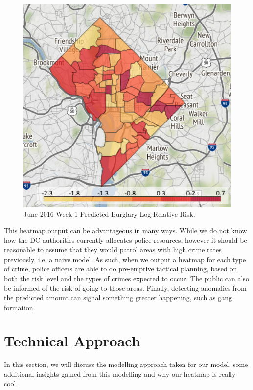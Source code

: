\documentclass[letterpaper]{article}
\begin{document}
	\begin{figure}[!ht]
		\includegraphics[width=\linewidth]{./p1.png}
		\caption{June 2016 Week 1 Predicted Burglary Log Relative Risk.}
		\label{p1}
	\end{figure}

	This heatmap output can be advantageous in many ways. While we do not know how the DC authorities currently allocates police resources, however it should be reasonable to assume that they would patrol areas with high crime rates previously, i.e. a naive model.
	As such, when we output a heatmap for each type of crime, police officers are able to do pre-emptive tactical planning, based on both the risk level and the types of crimes expected to occur.
	The public can also be informed of the risk of going to those areas. 
	Finally, detecting anomalies from the predicted amount can signal something greater happening, such as gang formation.
	
	\section{Technical Approach}
	
	In this section, we will discuss the modelling approach taken for our model, some additional insights gained from this modelling and why our heatmap is really cool.
	
\end{document}
